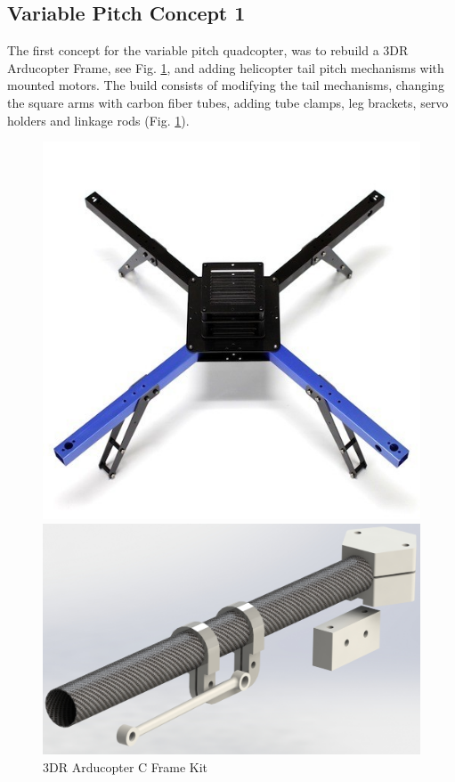 \newpage
\subsection{Variable Pitch Concept 1}

The first concept for the variable pitch quadcopter, was to rebuild a 3DR Arducopter Frame, see Fig. \ref{fig:Arducopter}, and adding helicopter tail pitch mechanisms with mounted motors. The build consists of modifying the tail mechanisms, changing the square arms with carbon fiber tubes, adding tube clamps, leg brackets, servo holders and linkage rods (Fig. \ref{fig:Arducopter}). 
\begin{figure}[h]
        \centering
         \begin{minipage}[b]{0,35\textwidth}
            \includegraphics[width =\textwidth, angle =0]{VAPIQ-PICTURES/3DRArducopterCframeKit}
              \caption{3DR Arducopter C Frame Kit}
           \label{fig:Arducopter}
        \end{minipage}
        \hfill
        \begin{minipage}[b]{0.35\textwidth}
            \includegraphics[width = \textwidth]{VAPIQ-PICTURES/ModForVPQ}

\end{minipage}
\end{figure}
